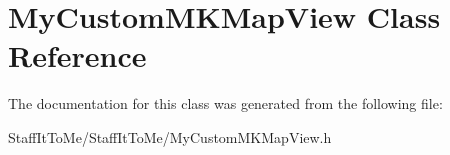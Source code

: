 \hypertarget{interface_my_custom_m_k_map_view}{
\section{\-My\-Custom\-M\-K\-Map\-View \-Class \-Reference}
\label{interface_my_custom_m_k_map_view}
}


\-The documentation for this class was generated from the following file\-:\begin{DoxyCompactItemize}
\item 
\-Staff\-It\-To\-Me/\-Staff\-It\-To\-Me/\-My\-Custom\-M\-K\-Map\-View.\-h\end{DoxyCompactItemize}
